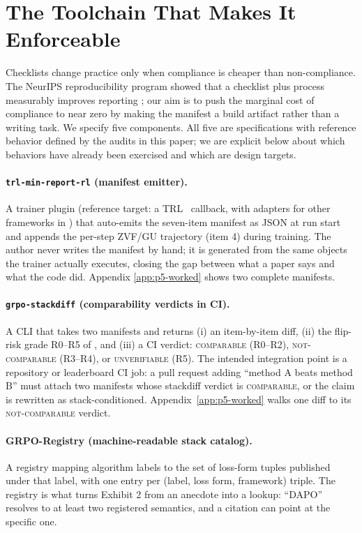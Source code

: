 \section{The Toolchain That Makes It Enforceable}
\label{sec:p5-toolchain}
Checklists change practice only when compliance is cheaper than
non-compliance. The NeurIPS reproducibility program showed that a checklist
plus process measurably improves reporting \citep{pineau2020improving}; our
aim is to push the marginal cost of compliance to near zero by making the
manifest a build artifact rather than a writing task. We specify five
components. All five are specifications with reference behavior defined by
the audits in this paper; we are explicit below about which behaviors have
already been exercised and which are design targets.

\paragraph{\texttt{trl-min-report-rl} (manifest emitter).} A trainer plugin
(reference target: a TRL~\citep{vonwerra2022trl} callback, with adapters for
other frameworks in ) that auto-emits the
seven-item manifest as JSON at run start and appends the per-step ZVF/GU
trajectory (item 4) during training. The author never writes the manifest by
hand; it is generated from the same objects the trainer actually executes,
closing the gap between what a paper says and what the code did. Appendix
\ref{app:p5-worked} shows two complete manifests.

\paragraph{\texttt{grpo-stackdiff} (comparability verdicts in CI).} A CLI
that takes two manifests and returns (i) an item-by-item diff, (ii) the
flip-risk grade R0--R5 of , and (iii) a CI verdict:
\textsc{comparable} (R0--R2), \textsc{not-comparable} (R3--R4), or
\textsc{unverifiable} (R5). The intended integration point is a repository or
leaderboard CI job: a pull request adding ``method A beats method B'' must
attach two manifests whose stackdiff verdict is \textsc{comparable}, or the
claim is rewritten as stack-conditioned. Appendix~\ref{app:p5-worked} walks
one diff to its \textsc{not-comparable} verdict.

\paragraph{GRPO-Registry (machine-readable stack catalog).} A registry
mapping algorithm labels to the set of loss-form tuples published under that
label, with one entry per (label, loss form, framework) triple. The registry
is what turns Exhibit 2 from an anecdote into a lookup: ``DAPO'' resolves to
at least two registered semantics, and a citation can point at the specific
one.

